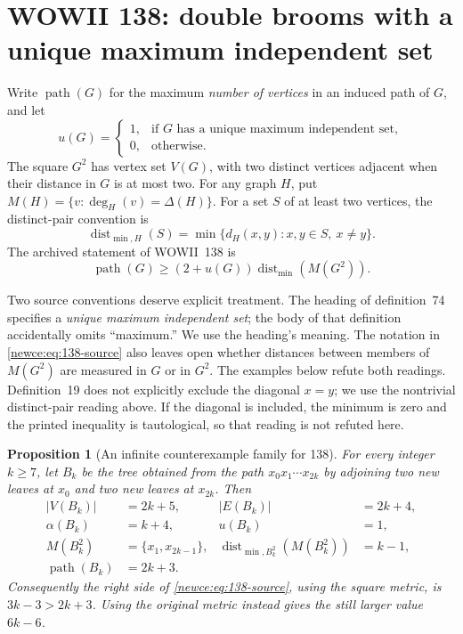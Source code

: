 \documentclass[11pt,a4paper]{article}
\newtheorem{proposition}[theorem]{Proposition}
\theoremstyle{remark}
\begin{document}
\section{WOWII 138: double brooms with a unique maximum independent set}
\label{sec:138}

Write $\operatorname{path}(G)$ for the maximum \emph{number of vertices}
in an induced path of $G$, and let
\[
u(G)=
\begin{cases}
1,&\text{if $G$ has a unique maximum independent set},\\
0,&\text{otherwise}.
\end{cases}
\]
The square $G^2$ has vertex set $V(G)$, with two distinct vertices adjacent
when their distance in $G$ is at most two.  For any graph $H$, put
$M(H)=\{v:\deg_H(v)=\Delta(H)\}$.
For a set $S$ of at least two vertices, the distinct-pair convention is
\[
\operatorname{dist}_{\min,H}(S)
   =\min\{d_H(x,y):x,y\in S,\ x\ne y\}.
\]
The archived statement of WOWII~138 is
\begin{equation}\label{newce:eq:138-source}
\operatorname{path}(G)
   \ge (2+u(G))\operatorname{dist}_{\min}(M(G^2)).
\end{equation}

Two source conventions deserve explicit treatment.  The heading of
definition~74 specifies a \emph{unique maximum independent set}; the body
of that definition accidentally omits ``maximum.''  We use the heading's
meaning.  The notation in \eqref{newce:eq:138-source} also leaves open
whether distances between members of $M(G^2)$ are measured in $G$ or in
$G^2$.  The examples below refute both readings.  Definition~19 does not
explicitly exclude the diagonal $x=y$; we use the nontrivial
distinct-pair reading above.  If the diagonal is included, the minimum
is zero and the printed inequality is tautological, so that reading is
not refuted here.

\begin{proposition}[An infinite counterexample family for 138]
\label{newce:prop:138}
For every integer $k\ge7$, let $B_k$ be the tree obtained from the path
$x_0x_1\cdots x_{2k}$ by adjoining two new leaves at $x_0$ and two new
leaves at $x_{2k}$.  Then
\begin{align}
|V(B_k)|&=2k+5, & |E(B_k)|&=2k+4,\label{newce:eq:138-size}\\
\alpha(B_k)&=k+4, & u(B_k)&=1,\label{newce:eq:138-alpha}\\
M(B_k^2)&=\{x_1,x_{2k-1}\}, &
\operatorname{dist}_{\min,B_k^2}(M(B_k^2))&=k-1,\label{newce:eq:138-square}\\
\operatorname{path}(B_k)&=2k+3.&&\label{newce:eq:138-path}
\end{align}
Consequently the right side of \eqref{newce:eq:138-source}, using the
square metric, is $3k-3>2k+3$.  Using the original metric instead gives
the still larger value $6k-6$.
\end{proposition}
\end{document}
